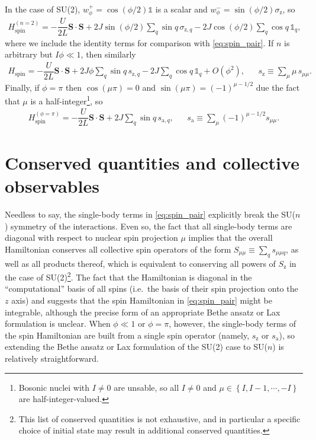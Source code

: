 \documentclass[nofootinbib,notitlepage,11pt]{revtex4-2}
\renewcommand{\t}{\text} %
\newcommand{\f}[2]{\dfrac{#1}{#2}} %
\newcommand{\p}[1]{\left(#1\right)} %
\renewcommand{\set}[1]{\left\{#1\right\}} %
\renewcommand{\v}{\bm} %
\renewcommand{\c}{\cdot} %
\newcommand{\1}{\mathds{1}}
\renewcommand{\a}{\text{a}}
\newcommand{\z}{\text{z}}
\begin{document}
In the case of SU(2), $w_\phi^+=\cos\p{\phi/2}\1$ is a scalar and $w_\phi^-=\sin\p{\phi/2}\sigma_\z$, so
\begin{align}
  H_{\t{spin}}^{(n=2)} = -\f{U}{2L} \v S\c\v S
  + 2J \sin\p{\phi/2} \sum_q \sin q\, \sigma_{\z,q}
  - 2J \cos\p{\phi/2} \sum_q \cos q\, \1_q,
\end{align}
where we include the identity terms for comparison with \eqref{eq:spin_pair}.
If $n$ is arbitrary but $I\phi\ll1$, then similarly
\begin{align}
  H_{\t{spin}} = -\f{U}{2L} \v S\c\v S
  + 2J \phi \sum_q \sin q\, s_{\z,q}
  - 2J \sum_q \cos q\, \1_q + O(\phi^2),
  &&
  s_\z \equiv \sum_\mu \mu\, s_{\mu\mu}.
\end{align}
Finally, if $\phi=\pi$ then $\cos\p{\mu\pi}=0$ and $\sin\p{\mu\pi}=\p{-1}^{\mu-1/2}$ due the fact that $\mu$ is a half-integer\footnote{Bosonic nuclei with $I\ne0$ are unsable, so all $I\ne0$ and $\mu\in\set{I,I-1,\cdots,-I}$ are half-integer-valued.}, so
\begin{align}
  H_{\t{spin}}^{(\phi=\pi)} = -\f{U}{2L} \v S\c\v S
  + 2J \sum_q \sin q\, s_{\a,q},
  &&
  s_\a \equiv \sum_\mu \p{-1}^{\mu-1/2} s_{\mu\mu}.
  \label{eq:spin_pi}
\end{align}

\section{Conserved quantities and collective observables}

Needless to say, the single-body terms in \eqref{eq:spin_pair} explicitly break the SU($n$) symmetry of the interactions.
Even so, the fact that all single-body terms are diagonal with respect to nuclear spin projection $\mu$ implies that the overall Hamiltonian conserves all collective spin operators of the form $S_{\mu\mu}\equiv\sum_q s_{\mu\mu q}$, as well as all products thereof, which is equivalent to conserving all powers of $S_\z$ in the case of SU(2)\footnote{This list of conserved quantities is not exhaustive, and in particular a specific choice of initial state may result in additional conserved quantities.}.
The fact that the Hamiltonian is diagonal in the ``computational'' basis of all spins (i.e.~the basis of their spin projection onto the $z$ axis) and suggests that the spin Hamiltonian in \eqref{eq:spin_pair} might be integrable, although the precise form of an appropriate Bethe ansatz or Lax formulation is unclear.
When $\phi\ll1$ or $\phi=\pi$, however, the single-body terms of the spin Hamiltonian are built from a single spin operator (namely, $s_\z$ or $s_\a$), so extending the Bethe ansatz or Lax formulation of the SU(2) case to SU($n$) is relatively straightforward.
\end{document}
